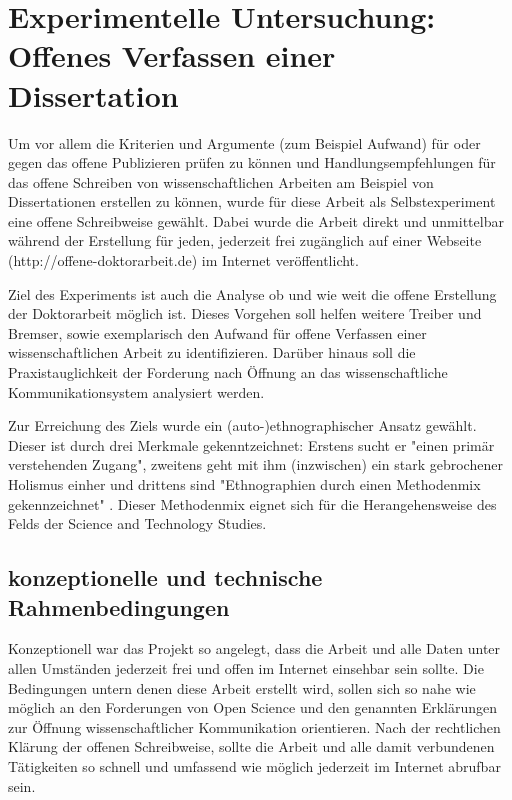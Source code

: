 \chapter{Experimentelle Untersuchung: Offenes Verfassen einer Dissertation}

Um vor allem die Kriterien und Argumente (zum Beispiel Aufwand) für oder gegen das offene Publizieren prüfen zu können und Handlungsempfehlungen für das offene Schreiben von wissenschaftlichen Arbeiten am Beispiel von Dissertationen erstellen zu können, wurde für diese Arbeit als Selbstexperiment eine offene Schreibweise gewählt. Dabei wurde die Arbeit direkt und unmittelbar während der Erstellung für jeden, jederzeit frei zugänglich auf einer Webseite (http://offene-doktorarbeit.de) im Internet veröffentlicht.

Ziel des Experiments ist auch die Analyse ob und wie weit die offene Erstellung der Doktorarbeit möglich ist. Dieses Vorgehen soll helfen weitere Treiber und Bremser, sowie exemplarisch den Aufwand für offene Verfassen einer wissenschaftlichen Arbeit zu identifizieren. Darüber hinaus soll die Praxistauglichkeit der Forderung nach Öffnung an das wissenschaftliche Kommunikationsystem analysiert werden.

Zur Erreichung des Ziels wurde ein (auto-)ethnographischer Ansatz gewählt. Dieser ist durch drei Merkmale gekenntzeichnet: Erstens sucht er  "einen primär verstehenden Zugang", zweitens geht mit ihm (inzwischen) ein stark gebrochener Holismus einher und drittens sind "Ethnographien durch einen Methodenmix gekennzeichnet" \cite{bachmann_2011_ethnographie}. Dieser Methodenmix eignet sich für die Herangehensweise des Felds der Science and Technology Studies.

\section{konzeptionelle und technische Rahmenbedingungen}

Konzeptionell war das Projekt so angelegt, dass die Arbeit und alle Daten unter allen Umständen jederzeit frei und offen im Internet einsehbar sein sollte. Die Bedingungen untern denen diese Arbeit erstellt wird, sollen sich so nahe wie möglich an den Forderungen von Open Science und den genannten Erklärungen zur Öffnung wissenschaftlicher Kommunikation orientieren. Nach der rechtlichen Klärung der offenen Schreibweise, sollte die Arbeit und alle damit verbundenen Tätigkeiten so schnell und umfassend wie möglich jederzeit im Internet abrufbar sein.

